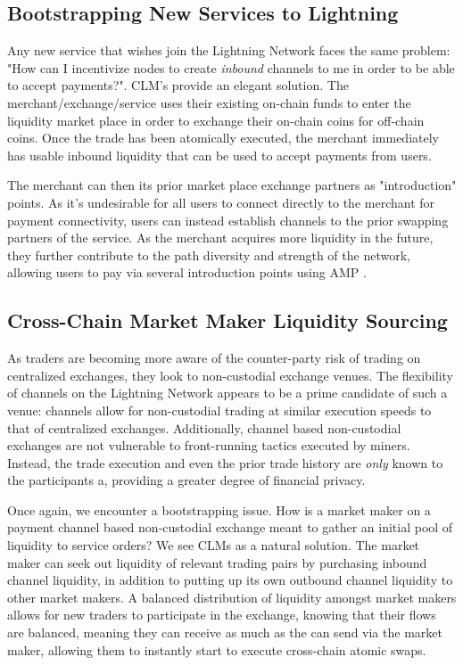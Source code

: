 \documentclass[12pt,a4paper]{article}
\theoremstyle{definition}
\begin{document}
\subsection{Bootstrapping New Services to Lightning}

Any new service that wishes join the Lightning Network faces the same problem:
"How can I incentivize nodes to create \emph{inbound} channels to me in order
to be able to accept payments?". CLM's provide an elegant solution. The
merchant/exchange/service uses their existing on-chain funds to enter the
liquidity market place in order to exchange their on-chain coins for off-chain
coins. Once the trade has been atomically executed, the merchant immediately
has usable inbound liquidity that can be used to accept payments from users.

The merchant can then its prior market place exchange partners as
"introduction" points. As it's undesirable for all users to connect directly to
the merchant for payment connectivity, users can instead establish channels to
the prior swapping partners of the service. As the merchant acquires more
liquidity in the future, they further contribute to the path diversity and
strength of the network, allowing users to pay via several introduction points
using AMP \cite{amp}.

\subsection{Cross-Chain Market Maker Liquidity Sourcing}

As traders are becoming more aware of the counter-party risk of trading on
centralized exchanges, they look to non-custodial exchange venues. The
flexibility of channels on the Lightning Network appears to be a prime
candidate of such a venue: channels allow for non-custodial trading at similar
execution speeds to that of centralized exchanges. Additionally, channel based
non-custodial exchanges are not vulnerable to front-running tactics executed by
miners. Instead, the trade execution and even the prior trade history are
\emph{only} known to the participants a, providing a greater degree of
financial privacy.

Once again, we encounter a bootstrapping issue. How is a market maker on a
payment channel based non-custodial exchange meant to gather an initial pool of
liquidity to service orders? We see CLMs as a natural solution. The market
maker can seek out liquidity of relevant trading pairs by purchasing inbound
channel liquidity, in addition to putting up its own outbound channel liquidity
to other market makers. A balanced distribution of liquidity amongst market
makers allows for new traders to participate in the exchange, knowing that
their flows are balanced, meaning they can receive as much as the can send via
the market maker, allowing them to instantly start to execute cross-chain
atomic swaps.
\end{document}
